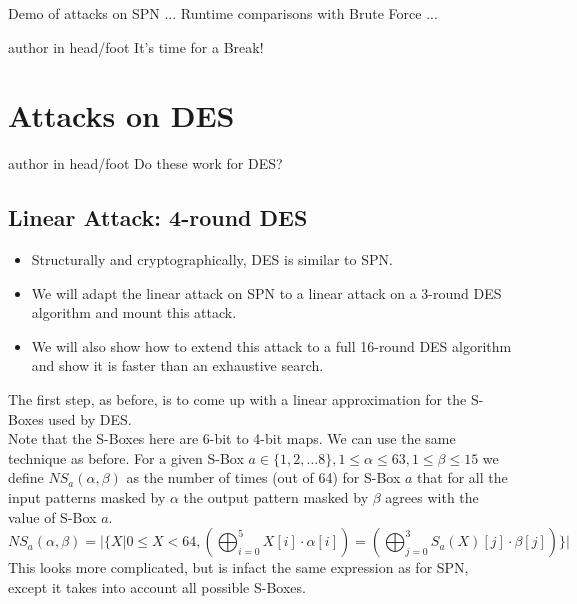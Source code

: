 \documentclass[9pt]{beamer}
\begin{document}
\begin{frame}
Demo of attacks on SPN ... Runtime comparisons with Brute Force ...

\end{frame}

\begin{frame}
\begin{beamercolorbox}[ht=2.5ex,dp=1.125ex,center,rounded=true,shadow=true]{author in head/foot}
It's time for a Break!
\end{beamercolorbox}
\end{frame}


\section{Attacks on DES}
\begin{frame}
\begin{beamercolorbox}[ht=2.5ex,dp=1.125ex,center,rounded=true,shadow=true]{author in head/foot}
Do these work for DES?
\end{beamercolorbox}
\end{frame}

\subsection{Linear Attack: 4-round DES}
\begin{frame}
\begin{itemize}
\item{Structurally and cryptographically, DES is similar to SPN.}
\item{We will adapt the linear attack on SPN to a linear attack on a 3-round DES algorithm and mount this attack.}
\item{We will also show how to extend this attack to a full 16-round DES algorithm and show it is faster than an exhaustive search.}
\end{itemize}
\end{frame}

\begin{frame}
The first step, as before, is to come up with a linear approximation for the S-Boxes used by DES.\\
\vspace{5mm}
Note that the S-Boxes here are 6-bit to 4-bit maps. We can use the same technique as before. For a given S-Box $a \in \{1, 2, \dots 8\}, 1 \leq \alpha \leq 63, 1 \leq \beta \leq 15$ we define $NS_{a}(\alpha, \beta)$ as the number of times (out of 64) for S-Box $a$ that for all the input patterns masked by $\alpha$ the output pattern masked by $\beta$ agrees with the value of S-Box $a$.
\[ NS_{a}(\alpha, \beta) = | \{ X | 0 \leq X < 64, ( \bigoplus_{i=0}^5 X[i]\cdot\alpha[i]) = (\bigoplus_{j=0}^3 S_a(X)[j] \cdot \beta[j])\} | \]
This looks more complicated, but is infact the same expression as for SPN, except it takes into account all possible S-Boxes.
\end{frame}
\end{document}

